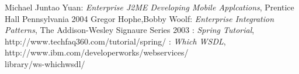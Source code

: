 \begin{thebibliography}{99}
 Michael Juntao Yuan: \emph{Enterprise J2ME Developing Mobile
Applcations}, Prentice Hall Pennsylvania 2004
 Gregor Hophe,Bobby Woolf: \emph{Enterprise Integration
Patterns}, The Addison-Wesley Signaure Series 2003
: \emph{Spring Tutorial},
http://www.techfaq360.com/tutorial/spring/
: \emph{Which WSDL},
http://www.ibm.com/developerworks/webservices/\\library/ws-whichwsdl/
\end{thebibliography}